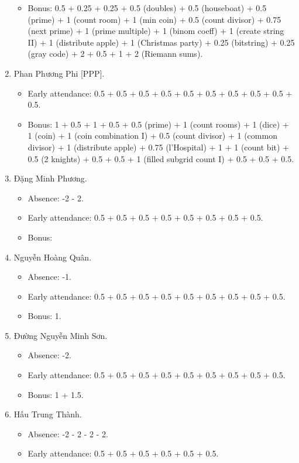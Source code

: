 \documentclass{article}
\begin{document}
\begin{enumerate}
\begin{itemize}
		\item Bonus: 0.5 + 0.25 + 0.25 + 0.5 (doubles) + 0.5 (houseboat) + 0.5 (prime) + 1 (count room) + 1 (min coin) + 0.5 (count divisor) + 0.75 (next prime) + 1 (prime multiple) + 1 (binom coeff) + 1 (create string II) + 1 (distribute apple) + 1 (Christmas party) + 0.25 (bitstring) + 0.25 (gray code) + 2 + 0.5 + 1 + 2 (Riemann sums).
	\end{itemize}
	\item {\sc Phan Phương Phi [PPP].}
	\begin{itemize}
		\item Early attendance: 0.5 + 0.5 + 0.5 + 0.5 + 0.5 + 0.5 + 0.5 + 0.5 + 0.5 + 0.5.
		\item Bonus: 1 + 0.5 + 1 + 0.5 + 0.5 (prime) + 1 (count rooms) + 1 (dice) + 1 (coin) + 1 (coin combination I) + 0.5 (count divisor) + 1 (common divisor) + 1 (distribute apple) + 0.75 (l'Hospital) + 1 + 1 (count bit) + 0.5 (2 knights) + 0.5 + 0.5 + 1 (filled subgrid count I) + 0.5 + 0.5 + 0.5.
	\end{itemize}
	\item {\sc Đặng Minh Phương.}
	\begin{itemize}
        \item Absence: -2 - 2.
		\item Early attendance: 0.5 + 0.5 + 0.5 + 0.5 + 0.5 + 0.5 + 0.5 + 0.5.
		\item Bonus:
	\end{itemize}
	\item {\sc Nguyễn Hoàng Quân.}
	\begin{itemize}
        \item Absence: -1.
		\item Early attendance: 0.5 + 0.5 + 0.5 + 0.5 + 0.5 + 0.5 + 0.5 + 0.5 + 0.5.
		\item Bonus: 1.
	\end{itemize}
	\item {\sc Đường Nguyễn Minh Sơn.}
	\begin{itemize}
        \item Absence: -2.
		\item Early attendance: 0.5 + 0.5 + 0.5 + 0.5 + 0.5 + 0.5 + 0.5 + 0.5 + 0.5.
		\item Bonus: 1 + 1.5.
	\end{itemize}
	\item {\sc Hấu Trung Thành.}
	\begin{itemize}
		\item Absence: -2 - 2 - 2 - 2.
		\item Early attendance: 0.5 + 0.5 + 0.5 + 0.5 + 0.5 + 0.5.

\end{itemize}
\end{enumerate}
\end{document}
